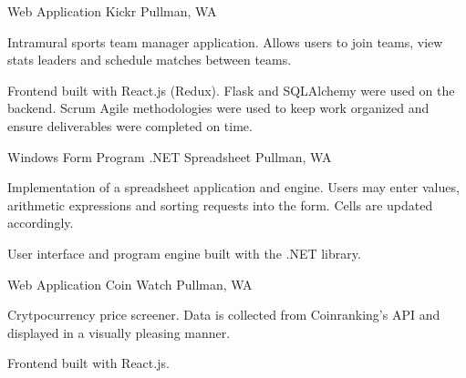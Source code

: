 \begin{cventries}
  \cventry
    {Web Application}
    {Kickr}
    {Pullman, WA}
    {}
    {
      \begin{cvitems}
        \item {Intramural sports team manager application. Allows users to join teams, view stats leaders and schedule matches between teams.}
        \item {Frontend built with React.js (Redux). Flask and SQLAlchemy were used on the backend. Scrum Agile methodologies were used to keep work organized and ensure deliverables were completed on time.}
      \end{cvitems}
    }
    \cventry
    {Windows Form Program}
    {.NET Spreadsheet}
    {Pullman, WA}
    {}
    {
      \begin{cvitems}
        \item {Implementation of a spreadsheet application and engine. Users may enter values, arithmetic expressions and sorting requests into the form. Cells are updated accordingly.} 
        \item{User interface and program engine built with the .NET library.}
      \end{cvitems}
    }
    \cventry
    {Web Application}
    {Coin Watch}
    {Pullman, WA}
    {}
    {
      \begin{cvitems}
        \item {Crytpocurrency price screener. Data is collected from Coinranking's API and displayed in a visually pleasing manner.}
        \item{Frontend built with React.js.}
      \end{cvitems}
    }
    
\end{cventries}
